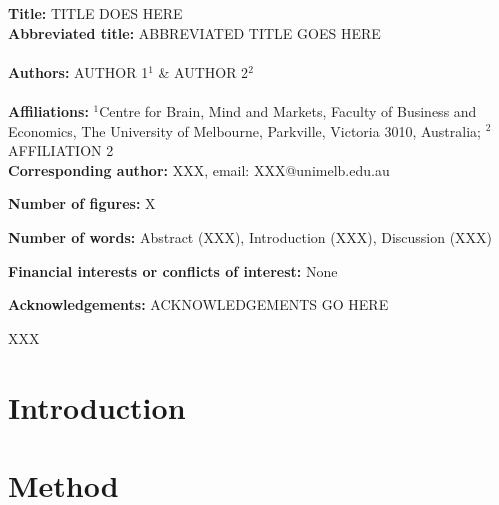 \documentclass[12pt,a4paper]{article}
\begin{document}
\noindent
{\bf Title:} TITLE DOES HERE\\

\noindent
{\bf Abbreviated title:} ABBREVIATED TITLE GOES HERE \\
\\
\noindent 
{\bf Authors:} AUTHOR 1$^{1}$ \& AUTHOR 2$^2$\\
\ \\
{\bf Affiliations:} $^1$Centre for Brain, Mind and Markets, Faculty of Business and Economics, The University of Melbourne, Parkville, Victoria 3010, Australia; $^2$AFFILIATION 2 \\

\noindent
{\bf Corresponding author:} XXX, email: XXX@unimelb.edu.au 

\noindent
{\bf Number of figures:} X 

\noindent
{\bf Number of words:} Abstract (XXX), Introduction (XXX), Discussion (XXX)

\noindent
{\bf Financial interests or conflicts of interest:} None 

\noindent
{\bf Acknowledgements:} ACKNOWLEDGEMENTS GO HERE


\newpage
\linenumbers


\newpage

 XXX

\newpage

\onehalfspacing

\section*{Introduction} \label{sec:intro}



\section*{Method} \label{sec:method}


\end{document}
